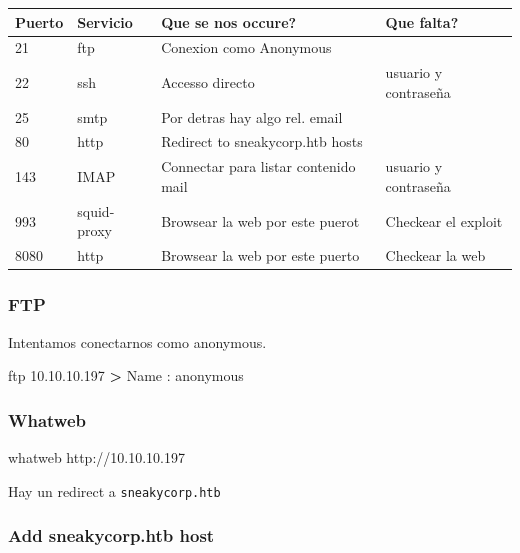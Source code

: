 \documentclass{assets/ipesethesis}
\newenvironment{Shaded}{\begin{snugshade}}{\end{snugshade}}
\newcommand{\ExtensionTok}[1]{#1}
\newcommand{\FunctionTok}[1]{\textcolor[rgb]{0.00,0.00,0.00}{#1}}
\newcommand{\NormalTok}[1]{#1}
\newcommand{\OperatorTok}[1]{\textcolor[rgb]{0.81,0.36,0.00}{\textbf{#1}}}
\begin{document}
\begin{longtable}[]{@{}llll@{}}
\toprule
Puerto & Servicio & Que se nos occure? & Que falta?\tabularnewline
\midrule
\endhead
21 & ftp & Conexion como Anonymous &\tabularnewline
22 & ssh & Accesso directo & usuario y contraseña\tabularnewline
25 & smtp & Por detras hay algo rel. email &\tabularnewline
80 & http & Redirect to sneakycorp.htb hosts &\tabularnewline
143 & IMAP & Connectar para listar contenido mail & usuario y contraseña\tabularnewline
993 & squid-proxy & Browsear la web por este puerot & Checkear el exploit\tabularnewline
8080 & http & Browsear la web por este puerto & Checkear la web\tabularnewline
\bottomrule
\end{longtable}

\hypertarget{ftp}{%
\subsubsection*{FTP}\label{ftp}}

Intentamos conectarnos como anonymous.

\begin{Shaded}
\begin{Highlighting}[]
\FunctionTok{ftp}\NormalTok{ 10.10.10.197}
\OperatorTok{>} \ExtensionTok{Name}\NormalTok{ : anonymous}
\end{Highlighting}
\end{Shaded}

\hypertarget{whatweb-2}{%
\subsubsection*{Whatweb}\label{whatweb-2}}

\begin{Shaded}
\begin{Highlighting}[]
\ExtensionTok{whatweb}\NormalTok{ http://10.10.10.197}
\end{Highlighting}
\end{Shaded}

Hay un redirect a \texttt{sneakycorp.htb}

\hypertarget{add-sneakycorp.htb-host}{%
\subsubsection*{Add sneakycorp.htb host}\label{add-sneakycorp.htb-host}}
\end{document}
